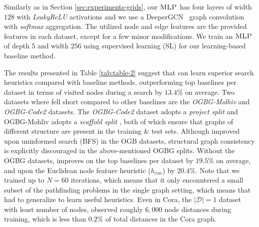 
Similarly as in Section \ref{sec:experiments-grids}, our $\textsc{MLP}$ has four layers of width $128$ with \textit{LeakyReLU} activations and we use a DeeperGCN~\cite{li2020deepergcn} graph convolution with \textit{softmax} aggregation. The utilized node and edge features are the provided features in each dataset, except for a few minor modifications. We train an $\textsc{MLP}$ of depth $5$ and width $256$ using supervised learning (SL) for our learning-based baseline method. 


 The results presented in Table \ref{tab:table-2} suggest that \phil can learn superior search heuristics compared with baseline methods, outperforming top baselines per dataset in terms of visited nodes during a search by $13.4 \%$ on average. Two datasets where \phil fell short compared to other baselines are the \textit{OGBG-Molhiv} and \textit{OGBG-Code2} datasets. The \textit{OGBG-Code2} dataset adopts a \textit{project split} \cite{allamanis2019adverse} and OGBG-Mohliv adopts a \textit{scaffold split} \cite{wu2018moleculenet}, both of which ensure that graphs of different structure are present in the training \& test sets. Although \phil improved upon uninformed search (BFS) in the OGB datasets, structural graph consistency is explicitly discouraged in the above-mentioned OGBG splits. Without the OGBG datasets, \phil improves on the top baselines per dataset by $19.5 \%$ on average, and upon the Euclidean node feature heuristic ($h_{euc}$) by $20.4 \%$. Note that we trained \phil up to $N = 60$ iterations, which means that it only encountered a small subset of the pathfinding problems in the single graph setting, which means that \phil had to generalize to learn useful heuristics. Even in Cora, the $|\mathcal{D}| = 1$ dataset with least number of nodes, \phil observed roughly $6,000$ node distances during training, which is less than $0.2 \%$ of total distances in the Cora graph.

